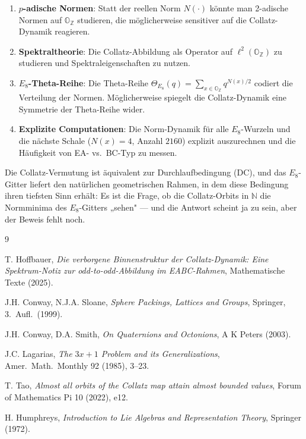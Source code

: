 \documentclass[12pt,a4paper]{article}
\newcommand{\OZ}{\mathbb{O}_{\mathbb{Z}}}  %
\newcommand{\Norm}[1]{N(#1)}       %
\newcommand{\N}{\mathbb{N}}
\begin{document}
\begin{enumerate}[label=(\arabic*)]
  \item \textbf{$p$-adische Normen}: Statt der reellen Norm $\Norm{\cdot}$
    könnte man 2-adische Normen auf $\OZ$ studieren, die möglicherweise
    sensitiver auf die Collatz-Dynamik reagieren.
  \item \textbf{Spektraltheorie}: Die Collatz-Abbildung als Operator auf
    $\ell^2(\OZ)$ zu studieren und Spektraleigenschaften zu nutzen.
  \item \textbf{$E_8$-Theta-Reihe}: Die Theta-Reihe
    $\Theta_{E_8}(q) = \sum_{x \in \OZ} q^{\Norm{x}/2}$
    codiert die Verteilung der Normen. Möglicherweise spiegelt die
    Collatz-Dynamik eine Symmetrie der Theta-Reihe wider.
  \item \textbf{Explizite Computationen}: Die Norm-Dynamik für alle
    $E_8$-Wurzeln und die nächste Schale ($\Norm{x}=4$, Anzahl $2160$)
    explizit auszurechnen und die Häufigkeit von EA- vs.\ BC-Typ zu messen.
\end{enumerate}

\bigskip
\begin{tcolorbox}[kernidee, title={Fazit in einem Satz}]
Die Collatz-Vermutung ist äquivalent zur Durchlaufbedingung (DC),
und das $E_8$-Gitter liefert den natürlichen geometrischen Rahmen,
in dem diese Bedingung ihren tiefsten Sinn erhält:
Es ist die Frage, ob die Collatz-Orbits in $\N$ die Normminima des
$E_8$-Gitters „sehen" — und die Antwort scheint ja zu sein,
aber der Beweis fehlt noch.
\end{tcolorbox}

\begin{thebibliography}{9}

T. Hoffbauer,
\textit{Die verborgene Binnenstruktur der Collatz-Dynamik:
Eine Spektrum-Notiz zur odd-to-odd-Abbildung im EABC-Rahmen},
Mathematische Texte (2025).

J.H. Conway, N.J.A. Sloane,
\textit{Sphere Packings, Lattices and Groups},
Springer, 3.\ Aufl.\ (1999).

J.H. Conway, D.A. Smith,
\textit{On Quaternions and Octonions},
A K Peters (2003).

J.C. Lagarias,
\textit{The $3x+1$ Problem and its Generalizations},
Amer.\ Math.\ Monthly 92 (1985), 3--23.

T. Tao,
\textit{Almost all orbits of the Collatz map attain almost bounded values},
Forum of Mathematics Pi 10 (2022), e12.

H. Humphreys,
\textit{Introduction to Lie Algebras and Representation Theory},
Springer (1972).

\end{thebibliography}
\end{document}
